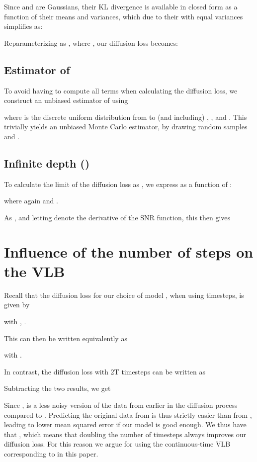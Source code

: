 \documentclass{article}
\begin{document}
Since  and  are Gaussians, their KL divergence is available in closed form as a function of their means and variances, which due to their with equal variances simplifies as:

Reparameterizing  as , where , our diffusion loss becomes:


\subsection{Estimator of }
To avoid having to compute all  terms when calculating the diffusion loss, we construct an unbiased estimator of  using

where  is the discrete uniform distribution from  to (and including) , ,  and . This trivially yields an unbiased Monte Carlo estimator, by drawing random samples  and .







\subsection{Infinite depth () }\label{sec:infdepth}
To calculate the limit of the diffusion loss as , we express  as a function of :

where again  and .

As , and letting  denote the derivative of the SNR function, this then gives


\section{Influence of the number of steps  on the VLB}
\label{appendix:more_steps}
Recall that the diffusion loss for our choice of model , when using  timesteps, is given by

with , .

This can then be written equivalently as

with .

In contrast, the diffusion loss with 2T timesteps can be written as

Subtracting the two results, we get


Since ,  is a less noisy version of the data from earlier in the diffusion process compared to . Predicting the original data  from  is thus strictly easier than from , leading to lower mean squared error if our model  is good enough. We thus have that , which means that doubling the number of timesteps always improves our diffusion loss. For this reason we argue for using the continuous-time VLB corresponding to  in this paper.
\end{document}
